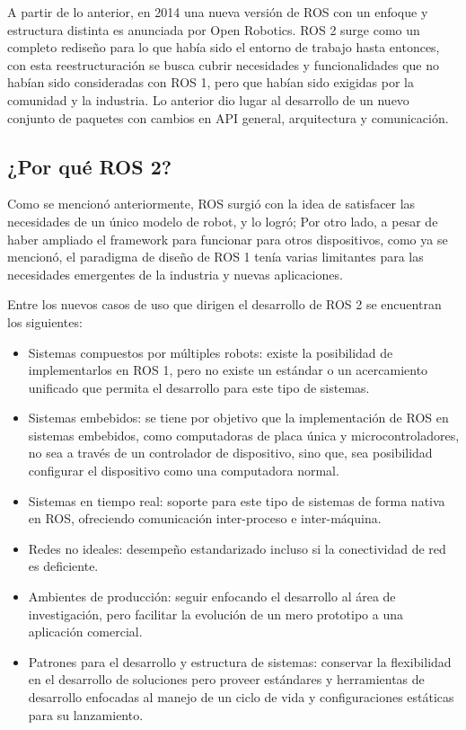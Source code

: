 A partir de lo anterior, en 2014 una nueva versión de ROS con un enfoque y estructura distinta es anunciada por Open Robotics.  ROS 2 surge como un completo rediseño para lo que había sido el entorno de trabajo hasta entonces, con esta reestructuración se busca cubrir necesidades y funcionalidades que no habían sido consideradas con  ROS 1, pero que habían sido exigidas por la comunidad y la industria. Lo anterior dio lugar al desarrollo de un nuevo conjunto de paquetes con cambios en API general, arquitectura y comunicación. 

\subsection{¿Por qué ROS 2?}

Como se mencionó anteriormente, ROS surgió con la idea de satisfacer las necesidades de un único modelo de robot, y lo logró; Por otro lado, a pesar de haber ampliado el framework para funcionar para otros dispositivos, como ya se mencionó, el paradigma de diseño de ROS 1 tenía varias limitantes para las necesidades emergentes de la industria y nuevas aplicaciones.

Entre los nuevos casos de uso que dirigen el desarrollo de ROS 2 se encuentran los siguientes:

\begin{itemize}
    \item Sistemas compuestos por múltiples robots: existe la posibilidad de implementarlos en ROS 1, pero no existe un estándar o un acercamiento unificado que permita el desarrollo para este tipo de sistemas.
    \item Sistemas embebidos: se tiene por objetivo que la implementación de ROS en sistemas embebidos, como computadoras de placa única y microcontroladores, no sea a través de un controlador de dispositivo, sino que, sea posibilidad configurar el dispositivo como una computadora normal.
    \item Sistemas en tiempo real: soporte para este tipo de sistemas de forma nativa en ROS, ofreciendo comunicación inter-proceso e inter-máquina.
    \item Redes no ideales: desempeño estandarizado incluso si la conectividad de red es deficiente.
    \item Ambientes de producción: seguir enfocando el desarrollo al área de investigación, pero facilitar la evolución de un mero prototipo a una aplicación comercial.
    \item Patrones para el desarrollo y estructura de sistemas: conservar la flexibilidad en el desarrollo de soluciones pero proveer estándares y herramientas de desarrollo enfocadas al manejo de un ciclo de vida y configuraciones estáticas para su lanzamiento.
\end{itemize}

